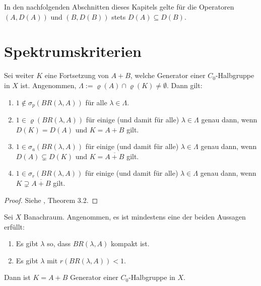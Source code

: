 \begin{verein}
In den nachfolgenden Abschnitten dieses Kapitels gelte für die Operatoren $(A, D(A))$ und $(B, D(B))$ stets $D(A)\subseteq D(B)$.
\end{verein}

\section{Spektrumskriterien}

\begin{fsatz}
 Sei weiter $K$ eine Fortsetzung von $A+B$, welche Generator einer $C_0$-Halbgruppe in $X$ ist. Angenommen,  $\Lambda:=\varrho(A)\cap \varrho(K)\neq \emptyset$. Dann gilt:
\begin{enumerate}
\item $1\not\in \sigma_p(BR(\lambda, A))$ für alle $\lambda\in\Lambda$.
\item $1\in \varrho(BR(\lambda, A))$ für einige (und damit für alle) $\lambda\in\Lambda$ genau dann, wenn $D(K)=D(A)$ und $K=A+B$ gilt.
\item $1\in\sigma_a(BR(\lambda, A))$ für einige (und damit für alle) $\lambda\in \Lambda$ genau dann, wenn $D(A)\subsetneq D(K)$ und $K=\overline{A+B}$ gilt.
\item $1\in\sigma_r(BR(\lambda, A))$ für einige (und damit für alle) $\lambda\in\Lambda$ genau dann, wenn $K\supsetneq \overline{A+B}$ gilt.
\end{enumerate}
\end{fsatz}

\begin{proof}
Siehe \cite{frosali_van_der_mee_mugelli_2004}, Theorem 3.2.
\end{proof}

\begin{satz}
Sei $X$ Banachraum. Angenommen, es ist mindestens eine der beiden Aussagen erfüllt:
\begin{enumerate}
\item Es gibt $\lambda$ so, dass $BR(\lambda, A)$ kompakt ist. 
\item Es gibt $\lambda$ mit $r(BR(\lambda, A))< 1$.
\end{enumerate}
Dann ist $K=A+B$ Generator einer $C_0$-Halbgruppe in $X$.
\end{satz}

